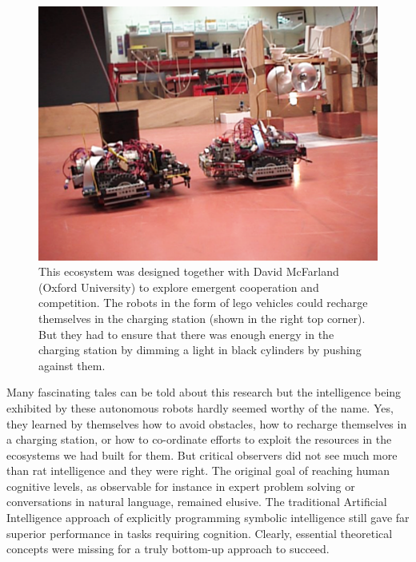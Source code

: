 \begin{figure}[htbp]
  \centerline{\includegraphics[width=.80\textwidth]{chap1/figs/ecosystem}}
\caption{\small This ecosystem was designed together with David McFarland (Oxford University) to explore 
emergent cooperation and competition. The robots in the form of lego vehicles could recharge themselves in the charging 
station (shown in the right top corner). But they had to ensure that there was enough energy in the charging 
station by dimming a light in black cylinders by pushing against them.}
\label{f:plate6}
\end{figure}

Many fascinating tales can be told about this research but the intelligence being exhibited 
by these autonomous robots hardly seemed worthy of the name. Yes, they learned
by themselves how to avoid obstacles, how to recharge themselves
in a charging station, or how to co-ordinate efforts 
to exploit the resources in the ecosystems we had built for 
them. But critical observers did not see much more than 
rat intelligence and they were right. The original 
goal of reaching human 
cognitive levels, as observable for instance in 
expert problem solving or conversations in natural
language, remained elusive. The 
traditional Artificial Intelligence
approach of explicitly programming symbolic intelligence
still gave far superior performance in tasks requiring
cognition. Clearly, essential theoretical concepts were 
missing for a truly bottom-up approach to succeed. 

